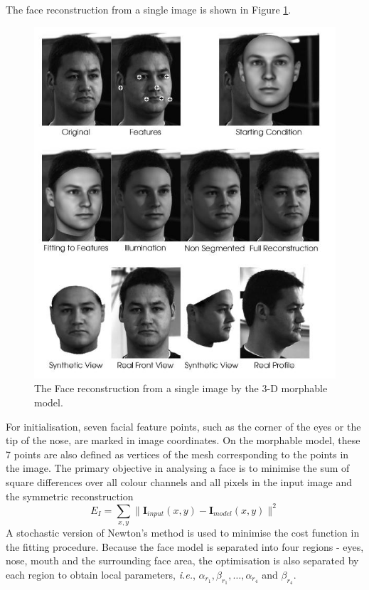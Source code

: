 The face reconstruction from a single image is shown in \mbox{Figure} \ref{fig:3DMMreconstruction}.
\begin{figure}[ht]
 \begin{center}
  \includegraphics[width=0.77\columnwidth]{ch2/figures/3DMMreconstruction.jpg}
  \caption{The Face reconstruction from a single image by the 3-D morphable model. \cite{Blanz2003}}
  \label{fig:3DMMreconstruction}
 \end{center}
\end{figure}
For initialisation, seven facial feature points, such as the corner of the eyes or the tip of the nose, are marked in image coordinates. On the morphable model, these 7 points are also defined as vertices of the mesh corresponding to the points in the image.
The primary objective in analysing a face is to minimise the sum of square differences over all colour channels and all pixels in the input image and the symmetric reconstruction
\begin{equation}
 E_I = \sum_{x,y}\|  \mathbf{I}_{input}(x,y) -  \mathbf{I}_{model}(x,y) \|^2
\end{equation}
A stochastic version of Newton's method is used to minimise the cost function in the fitting procedure. Because the face model is separated into four regions - eyes, nose, mouth and the surrounding face area, the optimisation is also separated by each region to obtain local parameters, \textit{i.e.}, $\alpha_{r_1}, \beta_{r_1},\ldots,\alpha_{r_4}$ and $\beta_{r_4}$.

